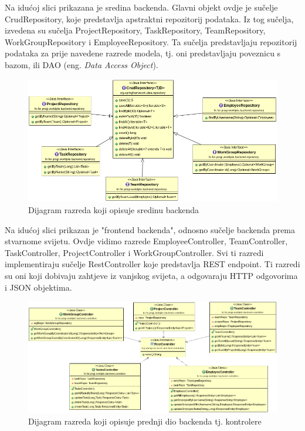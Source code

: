 			Na idućoj slici prikazana je sredina backenda. Glavni objekt ovdje je sučelje CrudRepository, koje predstavlja apstraktni repozitorij podataka. Iz tog sučelja, izvedena su sučelja ProjectRepository, TaskRepository, TeamRepository, WorkGroupRepository i EmployeeRepository. Ta sučelja predstavljaju repozitorij podataka za prije navedene razrede modela, tj. oni predstavljaju poveznicu s bazom, ili DAO (eng. \textit{Data Access Object}).  
			\begin{figure}[H]
				\includegraphics[width=\textwidth]{slike/CLASSD_middle.png}
				\centering
				\caption{Dijagram razreda koji opisuje sredinu backenda}
				\label{fig:classd_middle}
			\end{figure}
		
			Na idućoj slici prikazan je "frontend backenda", odnosno sučelje backenda prema stvarnome svijetu. Ovdje vidimo razrede EmployeeController, TeamController, TaskController, ProjectController i WorkGroupController. Svi ti razredi implementiraju sučelje RestController koje predstavlja REST endpoint. Ti razredi su oni koji dobivaju zahtjeve iz vanjskog svijeta, a odgovaraju HTTP odgovorima i JSON objektima. 
			\begin{figure}[H]
			\includegraphics[width=\textwidth]{slike/CLASSD_controllers.png}
			\centering
			\caption{Dijagram razreda koji opisuje prednji dio backenda tj. kontrolere}
			\label{fig:classd_controllers}
			\end{figure}
			\eject
		

